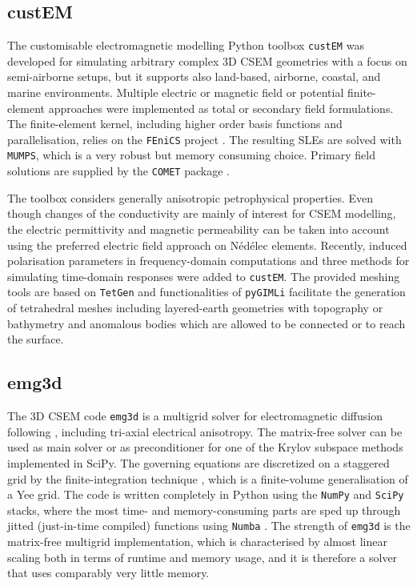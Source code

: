 \documentclass[extra, camera,%
]{gji}
\newcommand{\emg}[2]{\texttt{emg#1#2}\xspace}
\newcommand{\custem}{\texttt{custEM}\xspace}
\begin{document}
\subsection{custEM}

The customisable electromagnetic modelling Python toolbox \custem was developed for simulating arbitrary complex 3D CSEM geometries with a focus on semi-airborne setups, but it supports also land-based, airborne, coastal, and marine environments. Multiple electric or magnetic field or potential finite-element approaches were implemented as total or secondary field formulations. The finite-element kernel, including higher order basis functions and parallelisation, relies on the \texttt{FEniCS} project \citep{B.SPR.12.Logg, B.SPR.16.Langtangen}. The resulting SLEs are solved with \texttt{MUMPS}, which is a very robust but memory consuming choice. Primary field solutions are supplied by the \texttt{COMET} package \citep{GEO.20.Skibbe}.

The toolbox considers generally anisotropic petrophysical properties. Even though changes of the conductivity are mainly of interest for CSEM modelling, the electric permittivity and magnetic permeability can be taken into account using the preferred electric field approach on Nédélec elements. Recently, induced polarisation parameters in frequency-domain computations and three methods for simulating time-domain responses were added to \custem. The provided meshing tools are based on \texttt{TetGen} \citep{TOM.15.Si} and functionalities of \texttt{pyGIMLi} facilitate the generation of tetrahedral meshes including layered-earth geometries with topography or bathymetry and anomalous bodies which are allowed to be connected or to reach the surface.

\subsection{emg3d}

The 3D CSEM code \emg3d is a multigrid solver \citep{CMMP.64.Fedorenko} for electromagnetic diffusion following \cite{GP.06.Mulder}, including tri-axial electrical anisotropy. The matrix-free solver can be used as main solver or as preconditioner for one of the Krylov subspace methods implemented in SciPy. The governing equations are discretized on a staggered grid by the finite-integration technique \citep{AEU.77.Weiland}, which is a finite-volume generalisation of a Yee grid. The code is written completely in Python using the \texttt{NumPy} and \texttt{SciPy} stacks, where the most time- and memory-consuming parts are sped up through jitted (just-in-time compiled) functions using \texttt{Numba} \citep{LLVM.15.Lam}. The strength of \emg3d is the matrix-free multigrid implementation, which is characterised by almost linear scaling both in terms of runtime and memory usage, and it is therefore a solver that uses comparably very little memory.
\end{document}
